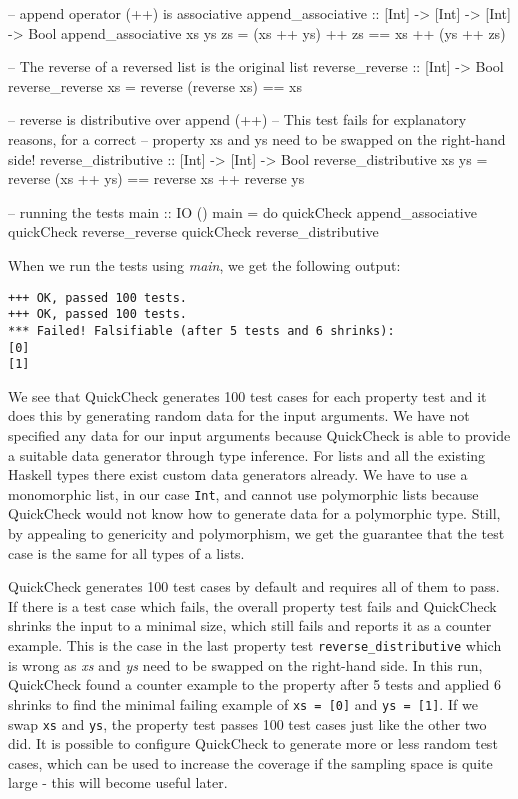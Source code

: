 \begin{HaskellCode}
-- append operator (++) is associative
append_associative :: [Int] -> [Int] -> [Int] -> Bool
append_associative xs ys zs = (xs ++ ys) ++ zs == xs ++ (ys ++ zs)

-- The reverse of a reversed list is the original list
reverse_reverse :: [Int] -> Bool
reverse_reverse xs = reverse (reverse xs) == xs

-- reverse is distributive over append (++)
-- This test fails for explanatory reasons, for a correct 
-- property xs and ys need to be swapped on the right-hand side!
reverse_distributive :: [Int] -> [Int] -> Bool
reverse_distributive xs ys = reverse (xs ++ ys) == reverse xs ++ reverse ys

-- running the tests
main :: IO ()
main = do
  quickCheck append_associative
  quickCheck reverse_reverse
  quickCheck reverse_distributive
\end{HaskellCode}

When we run the tests using \textit{main}, we get the following output:

\begin{verbatim}
+++ OK, passed 100 tests.
+++ OK, passed 100 tests.
*** Failed! Falsifiable (after 5 tests and 6 shrinks):    
[0]
[1]
\end{verbatim}

We see that QuickCheck generates 100 test cases for each property test and it does this by generating random data for the input arguments. We have not specified any data for our input arguments because QuickCheck is able to provide a suitable data generator through type inference. For lists and all the existing Haskell types there exist custom data generators already. We have to use a monomorphic list, in our case \texttt{Int}, and cannot use polymorphic lists because QuickCheck would not know how to generate data for a polymorphic type. Still, by appealing to genericity and polymorphism, we get the guarantee that the test case is the same for all types of a lists.

QuickCheck generates 100 test cases by default and requires all of them to pass. If there is a test case which fails, the overall property test fails and QuickCheck shrinks the input to a minimal size, which still fails and reports it as a counter example. This is the case in the last property test \texttt{reverse\_distributive} which is wrong as \textit{xs} and \textit{ys} need to be swapped on the right-hand side. In this run, QuickCheck found a counter example to the property after 5 tests and applied 6 shrinks to find the minimal failing example of \texttt{xs = [0]} and \texttt{ys = [1]}. If we swap \texttt{xs} and \texttt{ys}, the property test passes 100 test cases just like the other two did. It is possible to configure QuickCheck to generate more or less random test cases, which can be used to increase the coverage if the sampling space is quite large - this will become useful later.